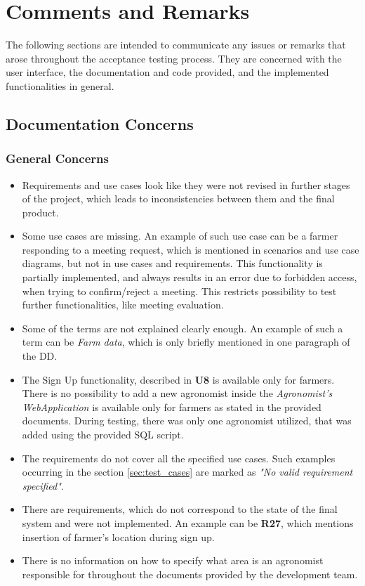 \chapter{Comments and Remarks} \label{ch:comments_and_remarks}

The following sections are intended to communicate any issues or remarks that arose throughout the acceptance testing process. They are concerned with the user interface, the documentation and code provided, and the implemented functionalities in general.

\section{Documentation Concerns}

\subsection{General Concerns}

\begin{itemize}
    \item Requirements and use cases look like they were not revised in further stages of the project, which leads to inconsistencies between them and the final product.
    \item Some use cases are missing. An example of such use case can be a farmer responding to a meeting request, which is mentioned in scenarios and use case diagrams, but not in use cases and requirements. This functionality is partially implemented, and always results in an error due to forbidden access, when trying to confirm/reject a meeting. This restricts possibility to test further functionalities, like meeting evaluation.
    \item Some of the terms are not explained clearly enough. An example of such a term can be \textit{Farm data}, which is only briefly mentioned in one paragraph of the DD.
    \item The Sign Up functionality, described in \textbf{U8} is available only for farmers. There is no possibility to add a new agronomist inside the \textit{Agronomist's WebApplication} is available only for farmers as stated in the provided documents. During testing, there was only one agronomist utilized, that was added using the provided SQL script.
    \item The requirements do not cover all the specified use cases. Such examples occurring in the section \ref{sec:test_cases} are marked as \textit{"No valid requirement specified"}.
    \item There are requirements, which do not correspond to the state of the final system and were not implemented. An example can be \textbf{R27}, which mentions insertion of farmer's location during sign up.
    \item There is no information on how to specify what area is an agronomist responsible for throughout the documents provided by the development team.
\end{itemize}

